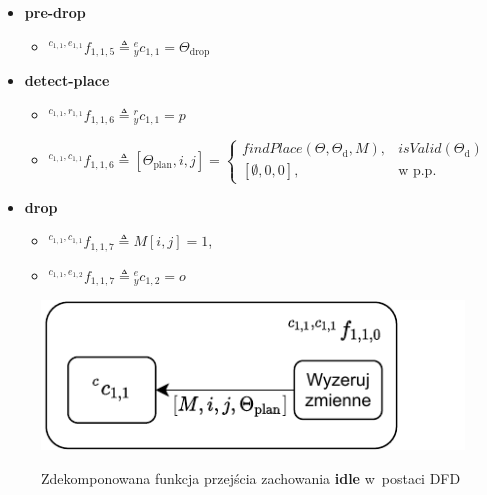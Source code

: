 \begin{itemize}
    \item \textbf{pre-drop} \begin{itemize}
        \item ${}^{c_{1,1}, e_{1,1}}f_{1,1,5} \triangleq {}^{e}_{y}c_{1,1} = \Theta_{\mathrm{drop}}$
    \end{itemize}

    \item \textbf{detect-place} \begin{itemize}
        \item ${}^{c_{1,1}, r_{1,1}}f_{1,1,6} \triangleq {}^{r}_{y}c_{1,1} = p$
        \item ${}^{c_{1,1}, c_{1,1}}f_{1,1,6} \triangleq [\Theta_{\mathrm{plan}}, i, j] =
            \begin{cases}
			    findPlace(\Theta, \Theta_{\mathrm{d}}, M), & isValid(\Theta_{\mathrm{d}})\\
                [\emptyset, 0, 0], & \text{w p.p.}
		    \end{cases}$
    \end{itemize}

    \item \textbf{drop} \begin{itemize}
        \item ${}^{c_{1,1}, c_{1,1}}f_{1,1,7} \triangleq M[i,j] = 1$,
        \item ${}^{c_{1,1}, e_{1,2}}f_{1,1,7} \triangleq {}^{e}_{y}c_{1,2} = o$
    \end{itemize}
\end{itemize}

\begin{figure}
    \centering
    \includegraphics[width=\columnwidth]{figures/ISR-cs-fp-idle.pdf}
    \label{fig:cs-fp-idle}
    \caption{Zdekomponowana funkcja przejścia zachowania \textbf{idle} w~postaci DFD}
\end{figure}

